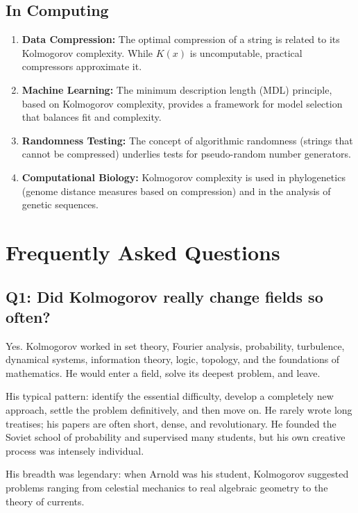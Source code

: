 \subsection{In Computing}

\begin{enumerate}
    \item \textbf{Data Compression:} The optimal compression of a string is related to its Kolmogorov complexity. While $K(x)$ is uncomputable, practical compressors approximate it.
    \item \textbf{Machine Learning:} The minimum description length (MDL) principle, based on Kolmogorov complexity, provides a framework for model selection that balances fit and complexity.
    \item \textbf{Randomness Testing:} The concept of algorithmic randomness (strings that cannot be compressed) underlies tests for pseudo-random number generators.
    \item \textbf{Computational Biology:} Kolmogorov complexity is used in phylogenetics (genome distance measures based on compression) and in the analysis of genetic sequences.
\end{enumerate}

\section{Frequently Asked Questions}

\subsection*{Q1: Did Kolmogorov really change fields so often?}

Yes. Kolmogorov worked in set theory, Fourier analysis, probability, turbulence, dynamical systems, information theory, logic, topology, and the foundations of mathematics. He would enter a field, solve its deepest problem, and leave.

His typical pattern: identify the essential difficulty, develop a completely new approach, settle the problem definitively, and then move on. He rarely wrote long treatises; his papers are often short, dense, and revolutionary. He founded the Soviet school of probability and supervised many students, but his own creative process was intensely individual.

His breadth was legendary: when Arnold was his student, Kolmogorov suggested problems ranging from celestial mechanics to real algebraic geometry to the theory of currents.

